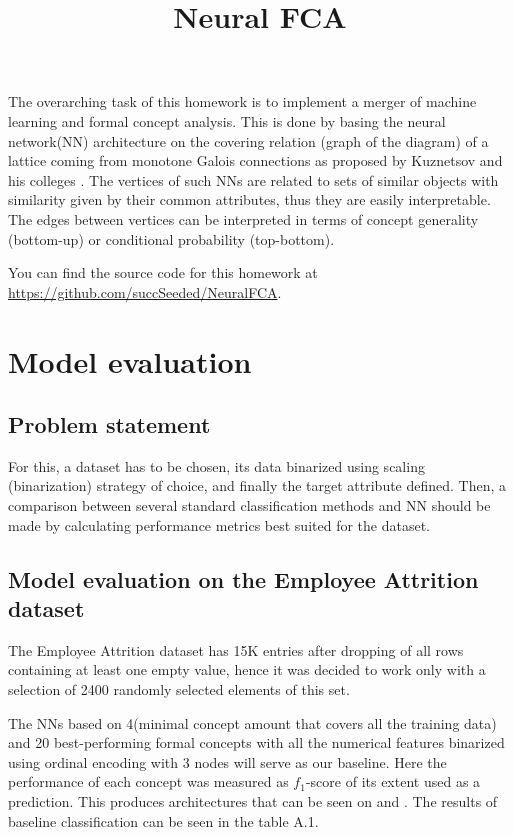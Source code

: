 \documentclass[14pt,a4paper]{extarticle}
\title{Neural FCA}
\begin{document}
	\maketitle
	
	\tableofcontents
	
	\begin{introduction}
		
		The overarching task of this homework is to implement a merger of machine learning and formal concept analysis. This is done by basing the neural network(NN) architecture on the covering relation (graph of the diagram) of a lattice coming from monotone Galois connections as proposed by Kuznetsov and his colleges \cite{NN_FCA}. The vertices of such NNs are related to sets of similar objects with similarity given by their common attributes, thus they are easily interpretable. The edges between vertices can be interpreted in terms of concept generality (bottom-up) or conditional probability (top-bottom). 
		
		You can find the source code for this homework at \url{https://github.com/succSeeded/NeuralFCA}.
		
	\end{introduction}
	
	\section{Model evaluation}
	\subsection{Problem statement}
	
	For this, a dataset has to be chosen, its data binarized using scaling (binarization) strategy of choice, and finally the target attribute defined. Then, a comparison between several standard classification methods and NN should be made by calculating performance metrics best suited for the dataset.
	
	\subsection{Model evaluation on the Employee Attrition dataset}
	
	The Employee Attrition dataset has 15K entries after dropping of all rows containing at least one empty value, hence it was decided to work only with a selection of 2400 randomly selected elements of this set.
	
	The NNs based on 4(minimal concept amount that covers all the training data) and 20 best-performing formal concepts with all the numerical features binarized using ordinal encoding with 3 nodes will serve as our baseline. Here the performance of each concept was measured as $f_1$-score of its extent used as a prediction. This produces architectures that can be seen on  and . The results of baseline classification can be seen in the table A.1.
	
\end{document}
